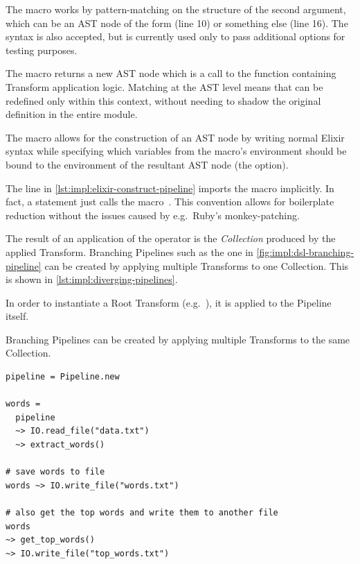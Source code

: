 The \exs{~>} macro works by pattern-matching on the structure of the second argument, which can be an AST node of the form  (line 10) or something else (line 16).
The  syntax is also accepted, but is currently used only to pass additional options for testing purposes.

The macro returns a new AST node which is a call to the  function containing Transform application logic.
Matching at the AST level means that \exs{--} can be redefined only within this context, without needing to shadow the original definition in the entire module.

The  macro allows for the construction of an AST node by writing normal Elixir syntax while specifying which variables from the macro's environment should be bound to the environment of the resultant AST node (the  option).

The  line in \cref{lst:impl:elixir-construct-pipeline} imports the \exs{~>} macro implicitly.
In fact, a  statement just calls the  macro~\cite[p.~35]{Elixir-Metaprogramming}.
This convention allows for boilerplate reduction without the issues caused by e.g.\ Ruby's monkey-patching.

The result of an application of the \exs{~>} operator is the \emph{Collection} produced by the applied Transform.
Branching Pipelines such as the one in \cref{fig:impl:dsl-branching-pipeline} can be created by applying multiple Transforms to one Collection.
This is shown in \cref{lst:impl:diverging-pipelines}.

In order to instantiate a Root Transform (e.g.\ ), it is applied to the Pipeline itself.

\begin{listing}[h]
	\caption[An example of creating branching Pipelines through application of multiple Transforms to one Collection.]{Branching Pipelines can be created by applying multiple Transforms to the same Collection.}
	\label{lst:impl:diverging-pipelines}
	\begin{verbatim}
pipeline = Pipeline.new

words =
  pipeline
  ~> IO.read_file("data.txt")
  ~> extract_words()
  
# save words to file
words ~> IO.write_file("words.txt")

# also get the top words and write them to another file
words
~> get_top_words()
~> IO.write_file("top_words.txt")
	\end{verbatim}
\end{listing}

